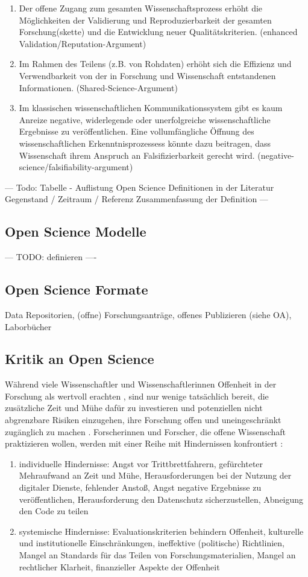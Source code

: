 \begin{enumerate}
\item Der offene Zugang zum gesamten Wissenschaftsprozess erhöht die Möglichkeiten der Validierung und Reproduzierbarkeit der gesamten Forschung(skette) und die Entwicklung neuer Qualitätskriterien. (enhanced Validation/Reputation-Argument)
\item Im Rahmen des Teilens (z.B. von Rohdaten) erhöht sich die Effizienz und Verwendbarkeit von der in Forschung und Wissenschaft entstandenen Informationen. (Shared-Science-Argument)
\item Im klassischen wissenschaftlichen Kommunikationssystem gibt es kaum Anreize negative, widerlegende oder unerfolgreiche wissenschaftliche Ergebnisse zu veröffentlichen. Eine vollumfängliche Öffnung des wissenschaftlichen Erkenntnisprozessess könnte dazu beitragen, dass Wissenschaft ihrem Anspruch an Falsifizierbarkeit gerecht wird. (negative-science/falsifiability-argument)
\end{enumerate}

--- Todo: Tabelle - Auflistung Open Science Definitionen in der Literatur  
Gegenstand / Zeitraum / Referenz
Zusammenfassung der Definition --- 

\subsection{Open Science Modelle}
--- TODO: definieren ----
\subsection{Open Science Formate}
Data Repositorien, (offne) Forschungsanträge, offenes Publizieren (siehe OA), Laborbücher

\subsection{Kritik an Open Science}

Während viele Wissenschaftler und Wissenschaftlerinnen Offenheit in der Forschung als wertvoll erachten \cite{suchen}, sind nur wenige tatsächlich bereit, die zusätzliche Zeit und Mühe dafür zu investieren und potenziellen nicht abgrenzbare Risiken einzugehen, ihre Forschung offen und uneingeschränkt zugänglich zu machen \cite{Scheliga_2014} \cite{Procter_2010}. Forscherinnen und Forscher, die offene Wissenschaft praktizieren wollen, werden mit einer Reihe mit Hindernissen konfrontiert \cite{Scheliga_2014}: 
\begin{enumerate}
\item individuelle Hindernisse: Angst vor Trittbrettfahrern, gefürchteter Mehraufwand an Zeit und Mühe, Herausforderungen bei der Nutzung der digitaler Dienste, fehlender Anstoß, Angst negative Ergebnisse zu veröffentlichen, Herausforderung den Datenschutz sicherzustellen, Abneigung den Code zu teilen
\item systemische Hindernisse: Evaluationskriterien behindern Offenheit, kulturelle und institutionelle Einschränkungen, ineffektive (politische) Richtlinien, Mangel an Standards für das Teilen von Forschungsmaterialien, Mangel an rechtlicher Klarheit, finanzieller Aspekte der Offenheit
\end{enumerate}

